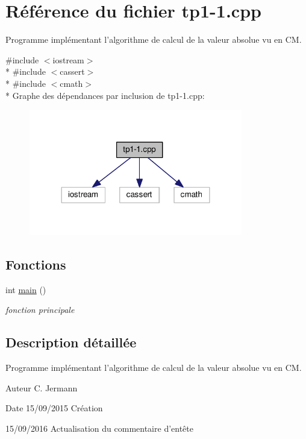 \hypertarget{tp1-1_8cpp}{\section{Référence du fichier tp1-\/1.cpp}
\label{tp1-1_8cpp}
}


Programme implémentant l'algorithme de calcul de la valeur absolue vu en C\+M.  


{\ttfamily \#include $<$iostream$>$}\\*
{\ttfamily \#include $<$cassert$>$}\\*
{\ttfamily \#include $<$cmath$>$}\\*
Graphe des dépendances par inclusion de tp1-\/1.cpp\+:
\nopagebreak
\begin{figure}[H]
\begin{center}
\leavevmode
\includegraphics[width=264pt]{tp1-1_8cpp__incl}
\end{center}
\end{figure}
\subsection*{Fonctions}
\begin{DoxyCompactItemize}
\item 
int \hyperlink{tp1-1_8cpp_ae66f6b31b5ad750f1fe042a706a4e3d4}{main} ()
\begin{DoxyCompactList}\small\item\em fonction principale \end{DoxyCompactList}\end{DoxyCompactItemize}


\subsection{Description détaillée}
Programme implémentant l'algorithme de calcul de la valeur absolue vu en C\+M. 

\begin{DoxyAuthor}{Auteur}
C. Jermann 
\end{DoxyAuthor}
\begin{DoxyDate}{Date}
15/09/2015 Création 

15/09/2016 Actualisation du commentaire d'entête 
\end{DoxyDate}


